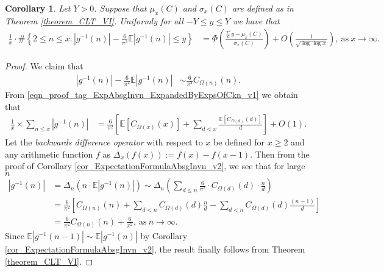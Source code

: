 \documentclass[11pt,reqno,a4letter]{article}
\numberwithin{figure}{section}
\numberwithin{table}{section}
\theoremstyle{plain}
\newtheorem{cor}[theorem]{Corollary}
\numberwithin{theorem}{section}
\theoremstyle{definition}
\begin{document}
\begin{cor} 
\label{cor_CLT_VII} 
Let $Y > 0$. Suppose that $\mu_x(C)$ and $\sigma_x(C)$ are defined as in 
Theorem \ref{theorem_CLT_VI}. 
Uniformly for all $-Y \leq y \leq Y$ 
we have that 
\begin{align*} 
\frac{1}{x} \cdot \#\left\{2 \leq n \leq x:|g^{-1}(n)| - 
     \frac{6}{\pi^2} \mathbb{E}|g^{-1}(n)| \leq y\right\} & = 
     \Phi\left(\frac{\frac{\pi^2}{6} y - \mu_x(C)}{\sigma_x(C)}\right) + 
     O\left(\frac{1}{\sqrt{\log\log x}}\right), 
     \mathrm{\ as\ } x \rightarrow \infty. 
\end{align*} 
\end{cor} 
\begin{proof} 
We claim that 
\begin{align*} 
|g^{-1}(n)| - \frac{6}{\pi^2} \mathbb{E}|g^{-1}(n)| & \sim \frac{6}{\pi^2} C_{\Omega(n)}(n). 
\end{align*} 
From \eqref{eqn_proof_tag_ExpAbsgInvn_ExpandedByExpsOfCkn_v1}
we obtain that 
\begin{align*} 
\frac{1}{x} \times \sum_{n \leq x} |g^{-1}(n)| & = 
     \frac{6}{\pi^2} \left[\mathbb{E}[C_{\Omega(x)}(x)] + \sum_{d<x} 
     \frac{\mathbb{E}[C_{\Omega(d)}(d)]}{d}\right] + O(1). 
\end{align*} 
Let the \emph{backwards difference operator} with respect to $x$ 
be defined for $x \geq 2$ and any arithmetic function $f$ as 
$\Delta_x(f(x)) := f(x) - f(x-1)$. Then from the proof of 
Corollary \ref{cor_ExpectationFormulaAbsgInvn_v2}, 
we see that for large $n$ 
\begin{align*} 
|g^{-1}(n)| & = \Delta_n(n \cdot \mathbb{E}|g^{-1}(n)|) 
     \sim \Delta_n\left(\sum_{d \leq n} \frac{6}{\pi^2} \cdot C_{\Omega(d)}(d) \cdot \frac{n}{d}\right) \\ 
     & = \frac{6}{\pi^2}\left[C_{\Omega(n)}(n) + \sum_{d < n} C_{\Omega(d)}(d) \frac{n}{d} - 
     \sum_{d<n} C_{\Omega(d)}(d) \frac{(n-1)}{d}\right] \\ 
     & = \frac{6}{\pi^2} C_{\Omega(n)}(n) + \frac{6}{\pi^2} , 
     \mathrm{\ as\ } n \rightarrow \infty. 
\end{align*} 
Since $\mathbb{E}|g^{-1}(n-1)| \sim \mathbb{E}|g^{-1}(n)|$ by 
Corollary \ref{cor_ExpectationFormulaAbsgInvn_v2}, 
the result finally follows from Theorem \ref{theorem_CLT_VI}. 
\end{proof} 
\end{document}
